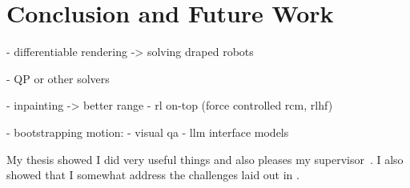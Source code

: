 \chapter[Conclusion and Future Work]{Conclusion and Future Work}
\label{chap:conclusion}
\minitoc

- differentiable rendering -> solving draped robots

- QP or other solvers

- inpainting -> better range
- rl on-top (force controlled rcm, rlhf)

- bootstrapping motion:
    - visual qa
- llm interface models

My thesis showed I did very useful things and also pleases my supervisor~\cite{Ourselin:MICCAI:00}. I also showed that I somewhat address the challenges laid out in .
